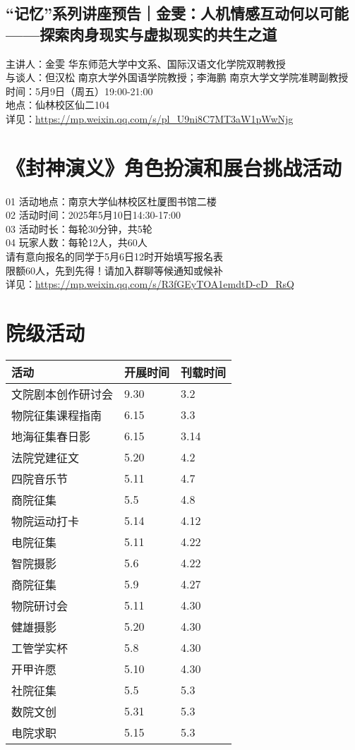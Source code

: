 \documentclass[letterpaper, 12pt]{article}
\begin{document}
\begin{multicols}{2}
\subsection{“记忆”系列讲座预告｜金雯：人机情感互动何以可能——探索肉身现实与虚拟现实的共生之道} %
主讲人：金雯 华东师范大学中文系、国际汉语文化学院双聘教授
\\与谈人：但汉松 南京大学外国语学院教授；李海鹏 南京大学文学院准聘副教授
\\时间：5月9日（周五）19:00-21:00
\\地点：仙林校区仙二104
\\详见：\url{https://mp.weixin.qq.com/s/pl_U9ni8C7MT3aW1pWwNjg}
\section{《封神演义》角色扮演和展台挑战活动} %
01 活动地点：南京大学仙林校区杜厦图书馆二楼
\\02 活动时间：2025年5月10日14:30-17:00
\\03 活动时长：每轮30分钟，共5轮
\\04 玩家人数：每轮12人，共60人
\\请有意向报名的同学于5月6日12时开始填写报名表
\\限额60人，先到先得！请加入群聊等候通知或候补
\\详见：\url{https://mp.weixin.qq.com/s/R3fGEyTOA1emdtD-cD_RsQ}
\section{院级活动}
\begin{tabular}{|>{\centering\arraybackslash}m{}|m{}|m{}|}
\hline
    活动 & 开展时间 & 刊载时间\\
    \hline\hline
    文院剧本创作研讨会 & 9.30 & 3.2\\
    物院征集课程指南 & 6.15 & 3.3\\
    地海征集春日影 & 6.15 & 3.14\\
    法院党建征文 & 5.20 & 4.2\\
    四院音乐节 & 5.11 & 4.7\\
    商院征集 & 5.5 & 4.8\\
    物院运动打卡 & 5.14 & 4.12\\
    电院征集 & 5.11 & 4.22\\
    智院摄影 & 5.6 & 4.22\\
    商院征集 & 5.9 & 4.27\\
    物院研讨会 & 5.11 & 4.30\\
    健雄摄影 & 5.20 & 4.30\\
    工管学实杯 & 5.8 & 4.30\\
    开甲许愿 & 5.10 & 4.30\\
    社院征集 & 5.5 & 5.3\\
    数院文创 & 5.31 & 5.3\\
    电院求职 & 5.15 & 5.3\\
    \hline
\end{tabular}



\end{multicols}
\end{document}
